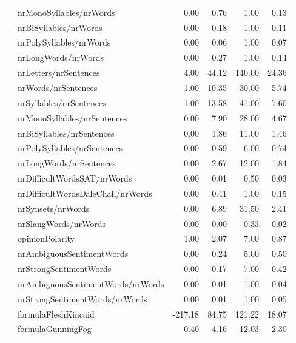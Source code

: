 \begin{tabular}{|l|l|r|r|r|r|}
 & nrMonoSyllables/nrWords & 0.00 & 0.76 & 1.00 & 0.13 \\ \cline{2-6}
 & nrBiSyllables/nrWords & 0.00 & 0.18 & 1.00 & 0.11 \\ \cline{2-6}
 & nrPolySyllables/nrWords & 0.00 & 0.06 & 1.00 & 0.07 \\ \cline{2-6}
 & nrLongWords/nrWords & 0.00 & 0.27 & 1.00 & 0.14 \\ \hline
\parbox[t]{2mm}{} & nrLetters/nrSentences & 4.00 & 44.12 & 140.00 & 24.36 \\ 
 & nrWords/nrSentences & 1.00 & 10.35 & 30.00 & 5.74 \\ 
 & nrSyllables/nrSentences & 1.00 & 13.58 & 41.00 & 7.60 \\ 
 & nrMonoSyllables/nrSentences & 0.00 & 7.90 & 28.00 & 4.67 \\ 
 & nrBiSyllables/nrSentences & 0.00 & 1.86 & 11.00 & 1.46 \\ 
 & nrPolySyllables/nrSentences & 0.00 & 0.59 & 6.00 & 0.74 \\ 
 & nrLongWords/nrSentences & 0.00 & 2.67 & 12.00 & 1.84 \\ \hline
\parbox[t]{2mm}{} & nrDifficultWordsSAT/nrWords & 0.00 & 0.01 & 0.50 & 0.03 \\ 
 & nrDifficultWordsDaleChall/nrWords & 0.00 & 0.41 & 1.00 & 0.15 \\ 
 & nrSynsets/nrWords & 0.00 & 6.89 & 31.50 & 2.41 \\ 
 & nrSlangWords/nrWords & 0.00 & 0.00 & 0.33 & 0.02 \\ \hline
\parbox[t]{2mm}{} & opinionPolarity & 1.00 & 2.07 & 7.00 & 0.87 \\ 
 & nrAmbiguousSentimentWords & 0.00 & 0.24 & 5.00 & 0.50 \\ 
 & nrStrongSentimentWords & 0.00 & 0.17 & 7.00 & 0.42 \\ 
 & nrAmbiguousSentimentWords/nrWords & 0.00 & 0.01 & 1.00 & 0.04 \\ 
 & nrStrongSentimentWords/nrWords & 0.00 & 0.01 & 1.00 & 0.05 \\ \hline
\parbox[t]{2mm}{} & formulaFleshKincaid & -217.18 & 84.75 & 121.22 & 18.07 \\ 
 & formulaGunningFog & 0.40 & 4.16 & 12.03 & 2.30 \\ 

\end{tabular}
